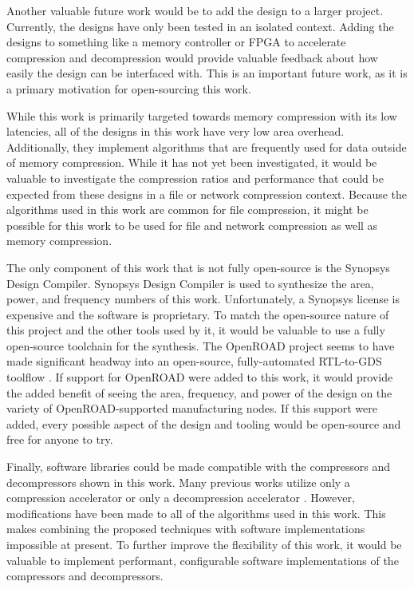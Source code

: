 \documentclass[doublespace,nopageskip]{VTthesis}
\begin{document}
Another valuable future work would be to add the design to a larger project. Currently, the designs have only been tested in an isolated context. Adding the designs to something like a memory controller or FPGA to accelerate compression and decompression would provide valuable feedback about how easily the design can be interfaced with. This is an important future work, as it is a primary motivation for open-sourcing this work.

While this work is primarily targeted towards memory compression with its low latencies, all of the designs in this work have very low area overhead. Additionally, they implement algorithms that are frequently used for data outside of memory compression. While it has not yet been investigated, it would be valuable to investigate the compression ratios and performance that could be expected from these designs in a file or network compression context. Because the algorithms used in this work are common for file compression, it might be possible for this work to be used for file and network compression as well as memory compression.

The only component of this work that is not fully open-source is the Synopsys Design Compiler. Synopsys Design Compiler is used to synthesize the area, power, and frequency numbers of this work. Unfortunately, a Synopsys license is expensive and the software is proprietary. To match the open-source nature of this project and the other tools used by it, it would be valuable to use a fully open-source toolchain for the synthesis. The OpenROAD project seems to have made significant headway into an open-source, fully-automated RTL-to-GDS toolflow \cite{openroad}. If support for OpenROAD were added to this work, it would provide the added benefit of seeing the area, frequency, and power of the design on the variety of OpenROAD-supported manufacturing nodes. If this support were added, every possible aspect of the design and tooling would be open-source and free for anyone to try.

Finally, software libraries could be made compatible with the compressors and decompressors shown in this work. Many previous works utilize only a compression accelerator or only a decompression accelerator \cite{hardwarelz4, fpgahuffmanlz77, gziponachip, hdfsgzip, ribeiro, deflatedecompression, lzrw1}. However, modifications have been made to all of the algorithms used in this work. This makes combining the proposed techniques with software implementations impossible at present. To further improve the flexibility of this work, it would be valuable to implement performant, configurable software implementations of the compressors and decompressors.
\end{document}

